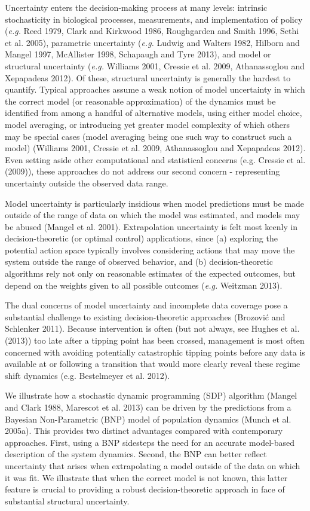 \documentclass[author-year, 12pt,review]{elsarticle} %
\begin{document}
Uncertainty enters the decision-making process at many levels: intrinsic
stochasticity in biological processes, measurements, and implementation
of policy (\emph{e.g.} Reed 1979, Clark and Kirkwood 1986, Roughgarden
and Smith 1996, Sethi et al. 2005), parametric uncertainty (\emph{e.g.}
Ludwig and Walters 1982, Hilborn and Mangel 1997, McAllister 1998,
Schapaugh and Tyre 2013), and model or structural uncertainty
(\emph{e.g.} Williams 2001, Cressie et al. 2009, Athanassoglou and
Xepapadeas 2012). Of these, structural uncertainty is generally the
hardest to quantify. Typical approaches assume a weak notion of model
uncertainty in which the correct model (or reasonable approximation) of
the dynamics must be identified from among a handful of alternative
models, using either model choice, model averaging, or introducing yet
greater model complexity of which others may be special cases (model
averaging being one such way to construct such a model) (Williams 2001,
Cressie et al. 2009, Athanassoglou and Xepapadeas 2012). Even setting
aside other computational and statistical concerns (e.g. Cressie et al.
(2009)), these approaches do not address our second concern -
representing uncertainty outside the observed data range.

Model uncertainty is particularly insidious when model predictions must
be made outside of the range of data on which the model was estimated,
and models may be abused (Mangel et al. 2001). Extrapolation uncertainty
is felt most keenly in decision-theoretic (or optimal control)
applications, since (a) exploring the potential action space typically
involves considering actions that may move the system outside the range
of observed behavior, and (b) decision-theoretic algorithms rely not
only on reasonable estimates of the expected outcomes, but depend on the
weights given to all possible outcomes (\emph{e.g.} Weitzman 2013).

The dual concerns of model uncertainty and incomplete data coverage pose
a substantial challenge to existing decision-theoretic approaches
(Brozović and Schlenker 2011). Because intervention is often (but not
always, see Hughes et al. (2013)) too late after a tipping point has
been crossed, management is most often concerned with avoiding
potentially catastrophic tipping points before any data is available at
or following a transition that would more clearly reveal these regime
shift dynamics (e.g. Bestelmeyer et al. 2012).

We illustrate how a stochastic dynamic programming (SDP) algorithm
(Mangel and Clark 1988, Marescot et al. 2013) can be driven by the
predictions from a Bayesian Non-Parametric (BNP) model of population
dynamics (Munch et al. 2005a). This provides two distinct advantages
compared with contemporary approaches. First, using a BNP sidesteps the
need for an accurate model-based description of the system dynamics.
Second, the BNP can better reflect uncertainty that arises when
extrapolating a model outside of the data on which it was fit. We
illustrate that when the correct model is not known, this latter feature
is crucial to providing a robust decision-theoretic approach in face of
substantial structural uncertainty.
\end{document}

